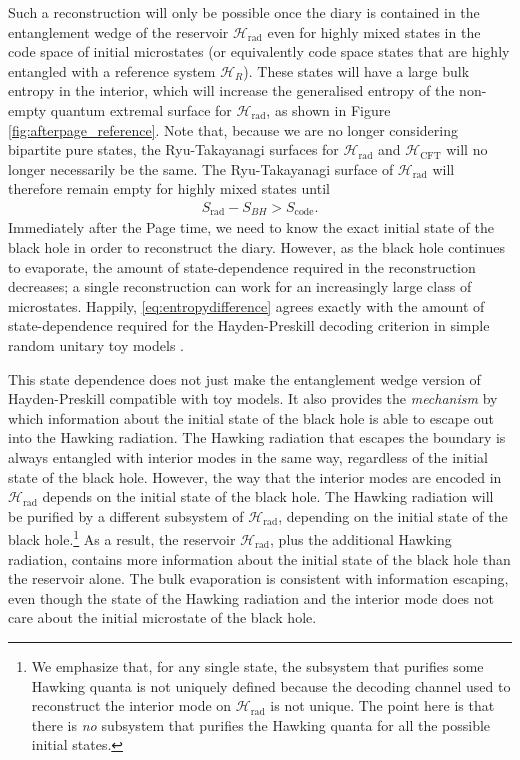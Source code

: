\documentclass[12pt]{article}
\newcommand{\Srad}{S_\text{rad} }
\begin{document}
Such a reconstruction will only be possible once the diary is contained in the entanglement wedge of the reservoir $\mathcal{H}_\text{rad}$ even for highly mixed states in the code space of initial microstates (or equivalently code space states that are highly entangled with a reference system $\mathcal{H}_R$). These states will have a large bulk entropy in the interior, which will increase the generalised entropy of the non-empty quantum extremal surface for $\mathcal{H}_\text{rad}$, as shown in Figure \ref{fig:afterpage_reference}. Note that, because we are no longer considering bipartite pure states, the Ryu-Takayanagi surfaces for $\mathcal{H}_\text{rad}$ and $\mathcal{H}_\text{CFT}$ will no longer necessarily be the same. The Ryu-Takayanagi surface of $\mathcal{H}_\text{rad}$ will therefore remain empty for highly mixed states until
\begin{align} \label{eq:entropydifference}
\Srad - S_{BH} > S_\text{code}.
\end{align}
Immediately after the Page time, we need to know the exact initial state of the black hole in order to reconstruct the diary. However, as the black hole continues to evaporate, the amount of state-dependence required in the reconstruction decreases; a single reconstruction can work for an increasingly large class of microstates. Happily, \eqref{eq:entropydifference} agrees exactly with the amount of state-dependence required for the Hayden-Preskill decoding criterion in simple random unitary toy models \cite{hayden2018learning}.

This state dependence does not just make the entanglement wedge version of Hayden-Preskill compatible with toy models. It also provides the \emph{mechanism} by which information about the initial state of the black hole is able to escape out into the Hawking radiation. The Hawking radiation that escapes the boundary is always entangled with interior modes in the same way, regardless of the initial state of the black hole. However, the way that the interior modes are encoded in $\mathcal{H}_\text{rad}$ depends on the initial state of the black hole. The Hawking radiation will be purified by a different subsystem of $\mathcal{H}_\text{rad}$, depending on the initial state of the black hole.\footnote{We emphasize that, for any single state, the subsystem that purifies some Hawking quanta is not uniquely defined because the decoding channel used to reconstruct the interior mode on $\mathcal{H}_\text{rad}$ is not unique. The point here is that there is \emph{no} subsystem that purifies the Hawking quanta for all the possible initial states.} As a result, the reservoir $\mathcal{H}_\text{rad}$, plus the additional Hawking radiation, contains more information about the initial state of the black hole than the reservoir alone. The bulk evaporation is consistent with information escaping, even though the state of the Hawking radiation and the interior mode does not care about the initial microstate of the black hole.
\end{document}
